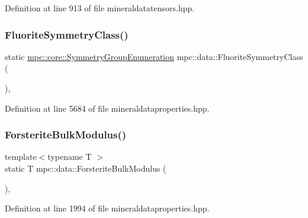 Definition at line 913 of file mineraldatatensors.\+hpp.

\mbox{\label{namespacempc_1_1data_aa9ee9ca25d7714b2d8407fb7dec10df9}} 
\subsubsection{\texorpdfstring{Fluorite\+Symmetry\+Class()}{FluoriteSymmetryClass()}}
{\footnotesize\ttfamily static \mbox{\hyperlink{namespacempc_1_1core_a9d979684062547055a0ef5c13077bad8}{mpc\+::core\+::\+Symmetry\+Group\+Enumeration}} mpc\+::data\+::\+Fluorite\+Symmetry\+Class (\begin{DoxyParamCaption}{ }\end{DoxyParamCaption})\hspace{0.3cm}{\ttfamily [inline]}, {\ttfamily [static]}}



Definition at line 5684 of file mineraldataproperties.\+hpp.

\mbox{\label{namespacempc_1_1data_a0c3157192fb6750d295dc73db5253b4b}} 
\subsubsection{\texorpdfstring{Forsterite\+Bulk\+Modulus()}{ForsteriteBulkModulus()}}
{\footnotesize\ttfamily template$<$typename T $>$ \\
static T mpc\+::data\+::\+Forsterite\+Bulk\+Modulus (\begin{DoxyParamCaption}{ }\end{DoxyParamCaption})\hspace{0.3cm}{\ttfamily [inline]}, {\ttfamily [static]}}



Definition at line 1994 of file mineraldataproperties.\+hpp.

\mbox{\label{namespacempc_1_1data_a2666a94f7066d312a7778cedb4b9252e}} 
